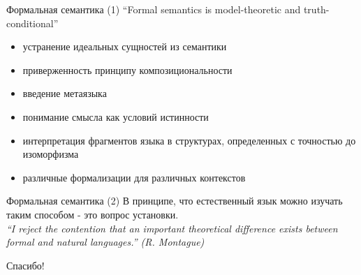\documentclass{beamer}
\begin{document}



\begin{frame}{Формальная семантика (1)}
``Formal semantics is model-theoretic and truth-conditional''\\
\bigskip
  \begin{itemize}
    \item устранение идеальных сущностей из семантики
    \item приверженность принципу композициональности
    \item введение метаязыка
    \item понимание смысла как условий истинности
    \item интерпретация фрагментов языка в структурах, определенных с точностью до изоморфизма
    \item различные формализации для различных контекстов
  \end{itemize}
\end{frame}

\begin{frame}{Формальная семантика (2)}
В принципе, что естественный язык можно изучать таким способом - это вопрос установки.\\
\bigskip
\textit{``I reject the contention that an important theoretical difference exists between formal and natural languages.'' (R. Montague) }
\end{frame}


\begin{frame}{}
    \thispagestyle{empty}
    \begin{center}
        {\large Спасибо!}
    \end{center}
\end{frame}


\end{document}
